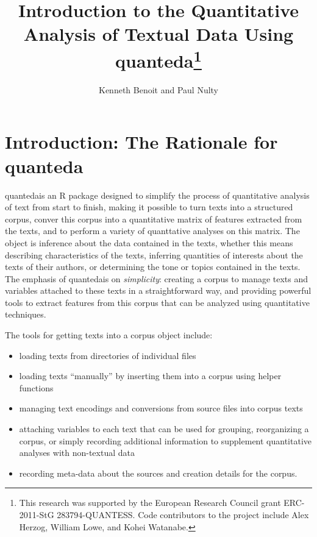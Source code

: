 \documentclass[11pt]{article}\usepackage[]{graphicx}\usepackage[]{color}
\newcommand{\quanteda}{\textsf{quanteda}}
\begin{document}






\title{Introduction to the Quantitative Analysis of Textual Data Using
  \quanteda\thanks{This research was supported by the European
    Research Council grant ERC-2011-StG 283794-QUANTESS.  Code
    contributors to the project include Alex Herzog, William Lowe, and
    Kohei Watanabe.}}

\author{Kenneth Benoit and Paul Nulty}

\maketitle

\setlength{\parskip}{1ex}
\setlength{\parindent}{0ex}

\section{Introduction: The Rationale for \quanteda}

\quanteda is an R package designed to simplify the process of
quantitative analysis of text from start to finish, making it possible
to turn texts into a structured corpus, conver this corpus into a
quantitative matrix of features extracted from the texts, and to
perform a variety of quanttative analyses on this matrix.  The object
is inference about the data contained in the texts, whether this means
describing characteristics of the texts, inferring quantities of
interests about the texts of their authors, or determining the tone or
topics contained in the texts.  The emphasis of \quanteda is on
\emph{simplicity}: creating a corpus to manage texts and variables
attached to these texts in a straightforward way, and providing
powerful tools to extract features from this corpus that can be
analyzed using quantitative techniques.

The tools for getting texts into a corpus object include: 
\begin{itemize}
\item loading texts from directories of individual files
\item loading texts ``manually'' by inserting them into a corpus using
  helper functions
\item managing text encodings and conversions from source files into
  corpus texts
\item attaching variables to each text that can be used for grouping,
  reorganizing a corpus, or simply recording additional information to
  supplement quantitative analyses with non-textual data
\item recording meta-data about the sources and creation details for
  the corpus.
\end{itemize}
\end{document}
